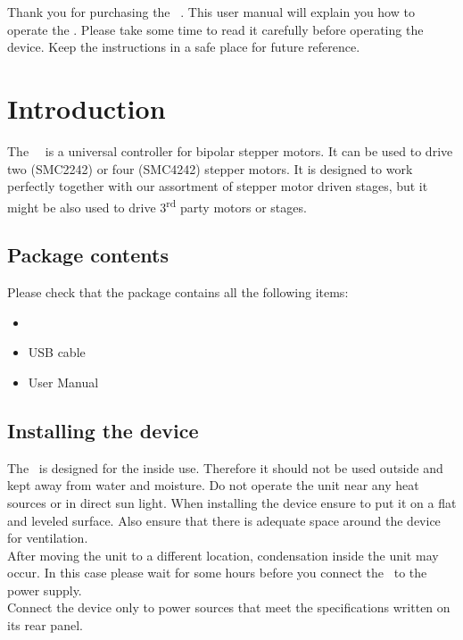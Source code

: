 Thank you for purchasing the \productNumber ~\productName. This user
manual will explain you how to operate the \productName. Please take
some time to read it carefully before operating the device. Keep the
instructions in a safe place for future reference.

\section{Introduction}
The \productNumber ~\productName ~is a universal controller for  bipolar stepper motors. It can be used to drive two (SMC2242) or four (SMC4242) stepper motors.
It is designed to work perfectly together with  our assortment of stepper motor driven stages, but it might be also used to drive 3\textsuperscript{rd} party motors or stages.

\subsection{Package contents}
Please check that the package contains all the following items:
\begin{itemize}
\item \productNumber ~\productName
\item USB cable
\item User Manual
\end{itemize}

\subsection{Installing the device}
The \productName ~is designed for the inside use. Therefore it should not be used outside and kept away from water and moisture. Do not operate the unit near any heat sources or in direct sun light. When installing the device ensure to put it on a flat and leveled surface. Also ensure that there is adequate space around the device for ventilation.\\
After moving the unit to a different location, condensation inside the unit may occur. In this case please wait for some hours before you connect the \productName ~to the power supply.\\
Connect the device only to power sources that meet the specifications written on its rear panel.

